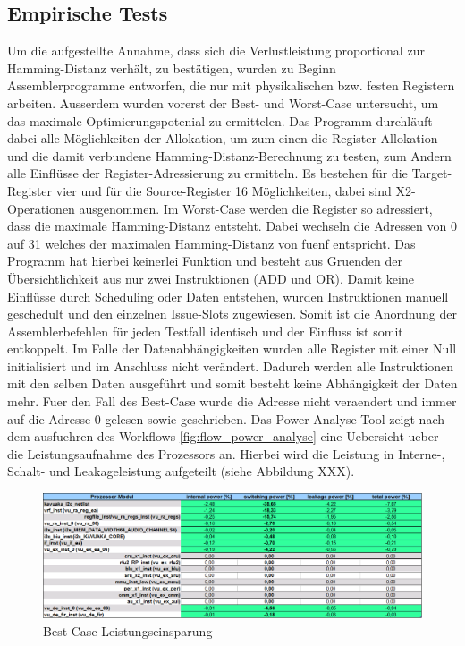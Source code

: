 \subsection{Empirische Tests}
\label{cap:empirischeTests}
Um die aufgestellte Annahme, dass sich die Verlustleistung proportional zur Hamming-Distanz verhält, zu bestätigen, wurden zu Beginn Assemblerprogramme entworfen, die nur mit physikalischen bzw. festen Registern arbeiten.
Ausserdem wurden vorerst der Best- und Worst-Case untersucht, um das maximale Optimierungspotenial zu ermittelen. Das Programm durchläuft dabei alle Möglichkeiten der Allokation, um zum einen die Register-Allokation und die damit verbundene Hamming-Distanz-Berechnung zu testen, zum Andern alle Einflüsse der Register-Adressierung zu ermitteln. Es bestehen für die Target-Register vier und für die Source-Register 16 Möglichkeiten, dabei sind X2-Operationen ausgenommen. Im Worst-Case werden die Register so adressiert, dass die maximale Hamming-Distanz entsteht. Dabei wechseln die Adressen von 0 auf 31 welches der maximalen Hamming-Distanz von fuenf entspricht. Das Programm hat hierbei keinerlei Funktion und besteht aus Gruenden der Übersichtlichkeit aus nur zwei Instruktionen (ADD und OR). Damit keine Einflüsse durch Scheduling oder Daten entstehen, wurden Instruktionen manuell geschedult und den einzelnen Issue-Slots zugewiesen. Somit ist die Anordnung der Assemblerbefehlen für jeden Testfall identisch und der Einfluss ist somit entkoppelt. Im Falle der Datenabhängigkeiten wurden alle Register mit einer Null initialisiert und im Anschluss nicht verändert. Dadurch werden alle Instruktionen mit den selben Daten ausgeführt und somit besteht keine Abhängigkeit der Daten mehr.
Fuer den Fall des Best-Case wurde die Adresse nicht veraendert und immer auf die Adresse 0 gelesen sowie geschrieben.
Das Power-Analyse-Tool zeigt nach dem ausfuehren des Workflows \ref{fig:flow_power_analyse} eine Uebersicht ueber die Leistungsaufnahme des Prozessors an. Hierbei wird die Leistung in Interne-, Schalt- und Leakageleistung aufgeteilt (siehe Abbildung XXX). 

\begin{figure}[htbp] 
	\centering
	\includegraphics[width=\textwidth]{fig/best_hierarchy.png}
	\caption{Best-Case Leistungseinsparung}
	\label{fig:bes_powersave}
\end{figure}

